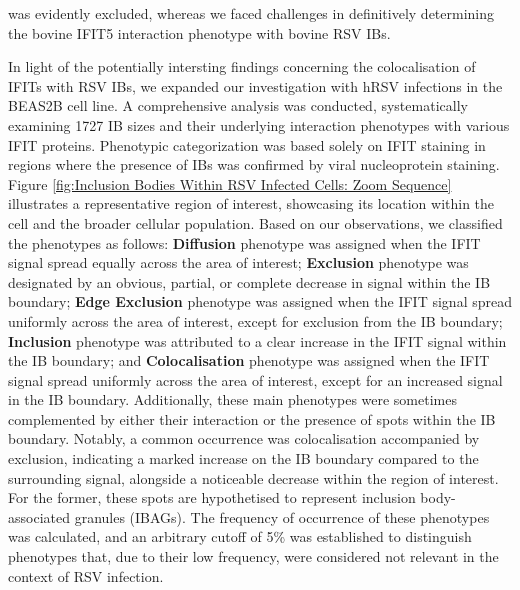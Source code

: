 was evidently excluded, whereas we faced challenges in definitively determining the bovine IFIT5 interaction phenotype with bovine RSV IBs.

In light of the potentially intersting findings concerning the colocalisation of IFITs with RSV IBs, we expanded our investigation with hRSV infections in the BEAS2B cell line. A comprehensive analysis was conducted, systematically examining 1727 IB sizes and their underlying interaction phenotypes with various IFIT proteins. Phenotypic categorization was based solely on IFIT staining in regions where the presence of IBs was confirmed by viral nucleoprotein staining. Figure \ref{fig:Inclusion Bodies Within RSV Infected Cells: Zoom Sequence} illustrates a representative region of interest, showcasing its location within the cell and the broader cellular population. Based on our observations, we classified the phenotypes as follows: \textbf{Diffusion} phenotype was assigned when the IFIT signal spread equally across the area of interest; \textbf{Exclusion} phenotype was designated by an obvious, partial, or complete decrease in signal within the IB boundary; \textbf{Edge Exclusion} phenotype was assigned when the IFIT signal spread uniformly across the area of interest, except for exclusion from the IB boundary; \textbf{Inclusion} phenotype was attributed to a clear increase in the IFIT signal within the IB boundary; and \textbf{Colocalisation} phenotype was assigned when the IFIT signal spread uniformly across the area of interest, except for an increased signal in the IB boundary. Additionally, these main phenotypes were sometimes complemented by either their interaction or the presence of spots within the IB boundary. Notably, a common occurrence was colocalisation accompanied by exclusion, indicating a marked increase on the IB boundary compared to the surrounding signal, alongside a noticeable decrease within the region of interest. For the former, these spots are hypothetised to represent inclusion body-associated granules (IBAGs). The frequency of occurrence of these phenotypes was calculated, and an arbitrary cutoff of 5\% was established to distinguish phenotypes that, due to their low frequency, were considered not relevant in the context of RSV infection.


